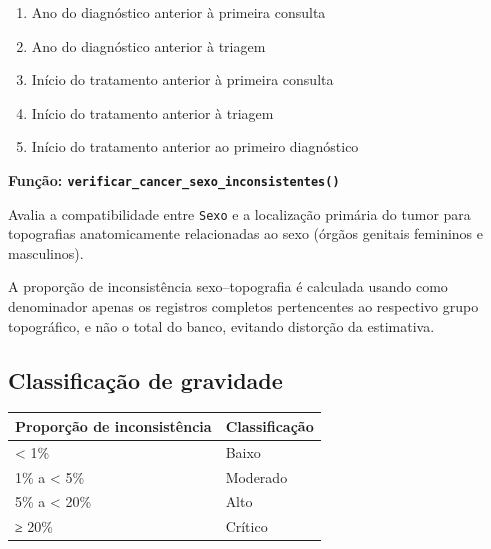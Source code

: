 \documentclass[
  brazilian,
  a4paper,
  oneside]{scrbook}
\newcounter{none} %
\providecommand{\tightlist}{%
  \setlength{\itemsep}{0pt}\setlength{\parskip}{0pt}}
\begin{document}
\begin{enumerate}
\def\labelenumi{\arabic{enumi}.}
\tightlist
\item
  Ano do diagnóstico anterior à primeira consulta
\item
  Ano do diagnóstico anterior à triagem
\item
  Início do tratamento anterior à primeira consulta
\item
  Início do tratamento anterior à triagem
\item
  Início do tratamento anterior ao primeiro diagnóstico
\end{enumerate}

\textbf{Função: \texttt{verificar\_cancer\_sexo\_inconsistentes()}}

Avalia a compatibilidade entre \texttt{Sexo} e a localização primária do
tumor para topografias anatomicamente relacionadas ao sexo (órgãos
genitais femininos e masculinos).

\begin{tcolorbox}[enhanced jigsaw, arc=.35mm, bottomrule=.15mm, bottomtitle=1mm, breakable, colback=white, colbacktitle=quarto-callout-important-color!10!white, colframe=quarto-callout-important-color-frame, coltitle=black, left=2mm, leftrule=.75mm, opacityback=0, opacitybacktitle=0.6, rightrule=.15mm, title=\textcolor{quarto-callout-important-color}{\faExclamation}\hspace{0.5em}{Denominador específico}, titlerule=0mm, toprule=.15mm, toptitle=1mm]

A proporção de inconsistência sexo--topografia é calculada usando como
denominador apenas os registros completos pertencentes ao respectivo
grupo topográfico, e não o total do banco, evitando distorção da
estimativa.

\end{tcolorbox}

\subsection{Classificação de
gravidade}\label{classificauxe7uxe3o-de-gravidade}

{\def\LTcaptype{none} %
\begin{longtable}[]{@{}ll@{}}
\toprule\noalign{}
Proporção de inconsistência & Classificação \\
\midrule\noalign{}
\endhead
\bottomrule\noalign{}
\endlastfoot
\textless{} 1\% & Baixo \\
1\% a \textless{} 5\% & Moderado \\
5\% a \textless{} 20\% & Alto \\
≥ 20\% & Crítico \\
\end{longtable}
}
\end{document}
